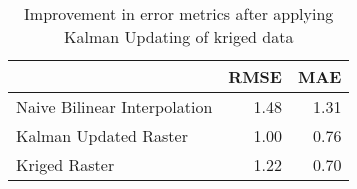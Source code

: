 \begin{table}
\centering
\caption{Improvement in error metrics after applying Kalman Updating of kriged data}
\label{tab:Petten_gebco_raster_error}
\begin{tabular}{lrr}
\toprule
 & RMSE & MAE \\
\midrule
Naive Bilinear Interpolation & 1.48 & 1.31 \\
Kalman Updated Raster & 1.00 & 0.76 \\
Kriged Raster & 1.22 & 0.70 \\
\bottomrule
\end{tabular}
\end{table}
